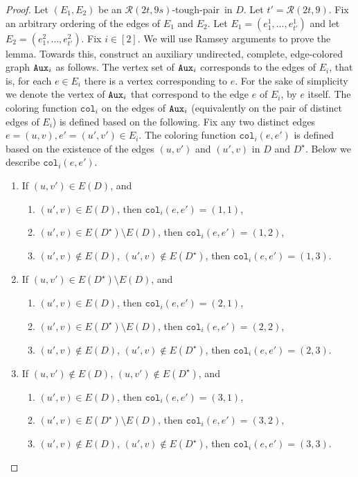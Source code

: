 \documentclass[a4paper,11pt]{article}
\theoremstyle{plain}
\newtheorem{identification rule}{Identification Rule}
\theoremstyle{definition}
\theoremstyle{remark}
\newcommand{\toughpair}{tough-pair}
\newcommand{\aux}[1]{\textnormal{\texttt{Aux}}_{#1}}
\newcommand{\col}{\texttt{col}}
\begin{document}
\begin{proof}
Let $(E_1,E_2)$ be an $ \mathcal{R}(2t,9s)$-\toughpair\ in $D$.
Let $t' =\mathcal{R}(2t,9)$.
 Fix an arbitrary ordering of the edges of $E_1$ and $E_2$.  Let $E_1=(e^1_1, \ldots, e^1_{t'})$ and let $E_2=(e^2_1, \ldots, e^2_{t'})$.
Fix $i \in [2]$. We will use Ramsey arguments to prove the lemma. Towards this, construct an auxiliary undirected, complete, edge-colored graph $\aux{i}$ as follows. The vertex set of $\aux{i}$ corresponds to the edges of $E_i$, that is, for each $e \in E_i$ there is a vertex corresponding to $e$.
For the sake of simplicity we denote the vertex of $\aux{i}$ that correspond to the edge $e$ of $E_i$, by $e$ itself.
The coloring function $\col_i$ on the edges of $\aux{i}$ (equivalently on the pair of distinct edges of $E_i$) is defined based on the following. Fix any two distinct edges $e=(u,v),e'=(u',v') \in E_i$. The coloring function $\col_i(e,e')$ is defined based on the existence of the edges $(u,v')$ and $(u',v)$ in $D$ and $D^{\star}$. Below we describe $\col_i(e,e')$.

\begin{enumerate}
\item If $(u,v') \in E(D)$, and
\begin{enumerate}
\item $(u',v) \in E(D)$, then $\col_i(e,e') =(1,1)$,
\item $(u',v) \in E(D^{\star}) \setminus E(D)$, then $\col_i(e,e') =(1,2)$,
\item $(u',v) \not \in E(D)$, $(u',v) \not \in E(D^{\star})$, then $\col_i(e,e') = (1,3)$.
\end{enumerate}

\item If $(u,v') \in E(D^{\star}) \setminus E(D)$, and
\begin{enumerate}
\item $(u',v) \in E(D)$, then $\col_i(e,e') =(2,1)$,
\item $(u',v) \in E(D^{\star}) \setminus E(D)$, then $\col_i(e,e') =(2,2)$,
\item $(u',v) \not \in E(D)$, $(u',v) \not \in E(D^{\star})$, then $\col_i(e,e') = (2,3)$.
\end{enumerate}

\item If $(u,v') \not \in E(D)$, $(u,v') \not \in E(D^{\star})$, and
\begin{enumerate}
\item $(u',v) \in E(D)$, then $\col_i(e,e') =(3,1)$,
\item $(u',v) \in E(D^{\star}) \setminus E(D)$, then $\col_i(e,e') =(3,2)$,
\item $(u',v) \not \in E(D)$, $(u',v) \not \in E(D^{\star})$, then $\col_i(e,e') = (3,3)$.
\end{enumerate}
\end{enumerate}


\end{proof}
\end{document}
